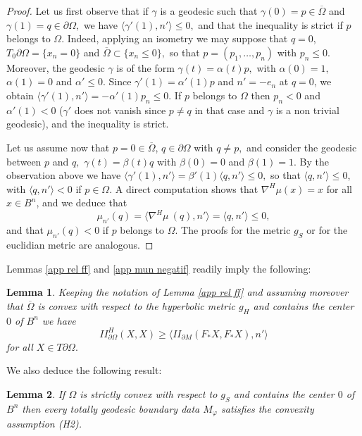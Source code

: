 \documentclass[10pt,reqno,oneside]{amsart}
\newtheorem{lem}{Lemma}[section]
\theoremstyle{definition}
\theoremstyle{remark}
\begin{document}
\begin{proof} 
Let us first observe that if $\gamma$ is a geodesic such that $\gamma(0)=p\in\overline{\Omega}$ and $\gamma(1)=q\in\partial\Omega,$ we have $\langle\gamma'(1),n'\rangle\leq 0,$ and that the inequality is strict if $p$ belongs to $\Omega$. Indeed, applying an isometry we may suppose that $q=0$, $T_0\partial\Omega=\{x_n=0\}$ and $\overline{\Omega}\subset\{x_n\leq 0\},$ so that $p=(p_1,\ldots,p_n)$ with $p_n\leq 0.$ Moreover, the geodesic $\gamma$ is of the form $\gamma(t)=\alpha(t)p,$ with $\alpha(0)=1,$ $\alpha(1)=0$ and $\alpha'\leq 0$. Since $\gamma'(1)=\alpha'(1)p$ and $n'=-e_n$ at $q=0$, we obtain $\langle\gamma'(1),n'\rangle=-\alpha'(1)p_n\leq 0$. If $p$ belongs to $\Omega$ then $p_n<0$ and $\alpha'(1)<0$ ($\gamma'$ does not vanish since $p\neq q$ in that case and $\gamma$ is a non trivial geodesic), and the inequality is strict.

Let us assume now that $p=0\in\overline{\Omega}$, $q\in\partial\Omega$ with $q\neq p,$ and consider the geodesic between $p$ and $q,$ $\gamma(t)=\beta(t)q$ with $\beta(0)=0$ and $\beta(1)=1$. By the observation above we have $\langle\gamma'(1),n'\rangle=\beta'(1)\langle q,n'\rangle\leq 0,$ so that $\langle q,n'\rangle\leq 0$, with $\langle q,n'\rangle<0$ if $p\in\Omega.$ A direct computation shows that $\nabla^H\mu(x)=x$ for all $x\in B^n$, and we deduce that
$$\mu_{n'}(q)=\langle \nabla^H\mu\ (q),n'\rangle=\langle q,n'\rangle\leq 0,$$
and that $\mu_{n'}(q)<0$ if $p$ belongs to $\Omega.$ The proofs for the metric $g_S$ or for the euclidian metric are analogous.
 \end{proof}
Lemmas \ref{app rel ff} and \ref{app mun negatif} readily imply the following:
\begin{lem}\label{app lem ff} 
Keeping the notation of Lemma \ref{app rel ff} and assuming moreover that $\overline{\Omega}$ is convex with respect to the hyperbolic metric $g_H$ and contains the center $0$ of $B^n$ we have
$$II_{\partial\Omega}^{H}(X,X)\geq \langle II_{\partial M}(F_*X,F_*X),n'\rangle$$
for all $X\in T\partial\Omega.$
\end{lem}
We also deduce the following result:
\begin{lem}\label{app lem tt geod H2}
If $\Omega$ is strictly convex with respect to $g_S$ and contains the center $0$ of $B^n$ then every totally geodesic boundary data $M_{\varphi}$ satisfies the convexity assumption (H2). 
\end{lem}
\end{document}
